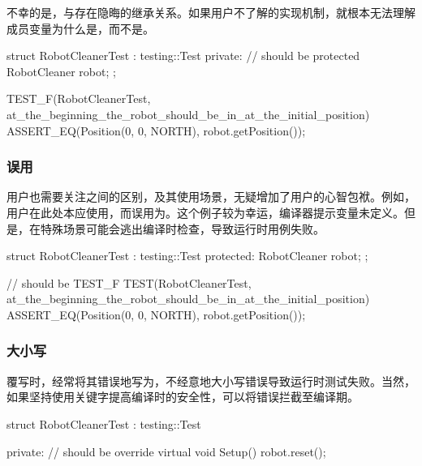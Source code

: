 \begin{content}
不幸的是，与存在隐晦的继承关系。如果用户不了解的实现机制，就根本无法理解成员变量为什么是，而不是。

\begin{leftbar}
 \begin{c++}
struct RobotCleanerTest : testing::Test {
private:  // should be protected
  RobotCleaner robot;
};
 
TEST_F(RobotCleanerTest, at_the_beginning_the_robot_should_be_in_at_the_initial_position) {
  ASSERT_EQ(Position(0, 0, NORTH), robot.getPosition());
}
  \end{c++}
\end{leftbar}

\subsubsection{误用}

用户也需要关注之间的区别，及其使用场景，无疑增加了用户的心智包袱。例如，用户在此处本应使用，而误用为。这个例子较为幸运，编译器提示变量未定义。但是，在特殊场景可能会逃出编译时检查，导致运行时用例失败。

\begin{leftbar}
 \begin{c++}
struct RobotCleanerTest : testing::Test {
protected:
  RobotCleaner robot;
};

// should be TEST\_F
TEST(RobotCleanerTest, at_the_beginning_the_robot_should_be_in_at_the_initial_position) {
  ASSERT_EQ(Position(0, 0, NORTH), robot.getPosition());
}
  \end{c++}
\end{leftbar}

\subsubsection{大小写}

覆写时，经常将其错误地写为，不经意地大小写错误导致运行时测试失败。当然，如果坚持使用关键字提高编译时的安全性，可以将错误拦截至编译期。

\begin{leftbar}
 \begin{c++}
struct RobotCleanerTest : testing::Test {
private:
  // should be override
  virtual void Setup() {
    robot.reset();
  }
 
}
\end{c++}
\end{leftbar}
\end{content}
